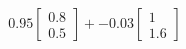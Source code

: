 \documentclass[preview]{standalone}
\begin{document}
\begin{align*}
0.95 \begin{bmatrix} 0.8 \\ 0.5 \end{bmatrix} + -0.03 \begin{bmatrix} 1 \\ 1.6 \end{bmatrix}
\end{align*}
\end{document}
